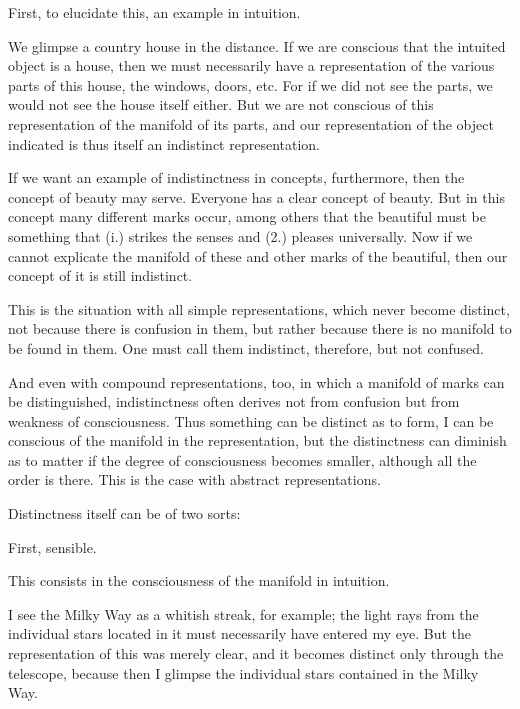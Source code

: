     First, to elucidate this, an example in intuition.

    We glimpse a country house in the distance.
    If we are conscious that the intuited object is a house,
    then we must necessarily have a representation of
    the various parts of this house, the windows, doors, etc.
    For if we did not see the parts,
    we would not see the house itself either.
    But we are not conscious of this
    representation of the manifold of its parts,
    and our representation of the object indicated is
    thus itself an indistinct representation.

    If we want an example of indistinctness in concepts, furthermore,
    then the concept of beauty may serve.
    Everyone has a clear concept of beauty.
    But in this concept many different marks occur,
    among others that the beautiful must be something that
    (i.) strikes the senses and
    (2.) pleases universally.
    Now if we cannot explicate the manifold of these
    and other marks of the beautiful,
    then our concept of it is still indistinct.

    This is the situation with all simple representations,
    which never become distinct,
    not because there is confusion in them,
    but rather because there is no manifold to be found in them.
    One must call them indistinct, therefore, but not confused.

    And even with compound representations, too, in which
    a manifold of marks can be distinguished,
    indistinctness often derives not from confusion
    but from weakness of consciousness.
    Thus something can be distinct as to form,
    I can be conscious of the manifold in the representation,
    but the distinctness can diminish as to matter
    if the degree of consciousness becomes smaller,
    although all the order is there.
    This is the case with abstract representations.

Distinctness itself can be of two sorts:

First, sensible.

This consists in the consciousness of the manifold in intuition.

    I see the Milky Way as a whitish streak, for example;
    the light rays from the individual stars located in it
    must necessarily have entered my eye.
    But the representation of this was merely clear,
    and it becomes distinct only through the telescope,
    because then I glimpse the individual stars
    contained in the Milky Way.

